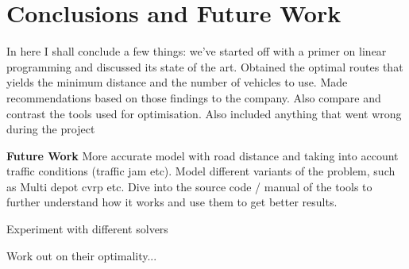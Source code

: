 \chapter{Conclusions and Future Work}
In here I shall conclude a few things: we've started off with a primer on linear programming and discussed its state
 of the art. Obtained the optimal routes that yields the minimum distance and the number of vehicles to use. Made
 recommendations based on those findings to the company. Also compare and contrast the tools used for optimisation. Also
 included anything that went wrong during the project

\textbf{Future Work}
More accurate model with road distance and taking into account traffic conditions (traffic jam etc). Model
 different variants of the problem, such as Multi depot cvrp etc. Dive into the source  code / manual of
 the tools to further understand how it works and use them to get better results.

 Experiment with different solvers

 Work out on their optimality...